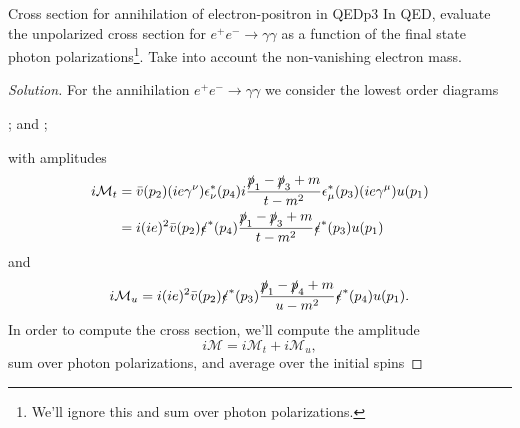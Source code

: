 \begin{problem}{Cross section for annihilation of electron-positron in QED}{p3}
    In QED, evaluate the unpolarized cross section for \(e^+ e^- \to \gamma \gamma\) as a function of the final state photon polarizations\footnote{We'll ignore this and sum over photon polarizations.}. Take into account the non-vanishing electron mass.
\end{problem}
\begin{proof}[Solution]
    For the annihilation \(e^+ e^- \to \gamma \gamma\) we consider the lowest order diagrams
    \begin{center}
        ;
        and
        ;
    \end{center}
    with amplitudes
    \begin{align*}
        i \mathcal{M}_t &= \bar{v}(p_2) (i e \gamma^\nu) \epsilon^*_{\nu}(p_4) i\frac{\slashed{p}_1 - \slashed{p}_3 + m}{t - m^2} \epsilon^*_{\mu}(p_3) (i e \gamma^\mu) u(p_1) \\
                        &= i(ie)^2 \bar{v}(p_2) \slashed{\epsilon}^*(p_4) \frac{\slashed{p}_1 - \slashed{p}_3 + m}{t - m^2} \slashed{\epsilon}^*(p_3) u(p_1)
    \end{align*}
    and
    \begin{equation*}
        i\mathcal{M}_u = i(ie)^2 \bar{v}(p_2) \slashed{\epsilon}^*(p_3) \frac{\slashed{p}_1 - \slashed{p}_4 + m}{u - m^2} \slashed{\epsilon}^*(p_4) u(p_1).
    \end{equation*}
    In order to compute the cross section, we'll compute the amplitude
    \begin{equation*}
        i \mathcal{M} = i\mathcal{M}_t +  i\mathcal{M}_u,
    \end{equation*}
    sum over photon polarizations, and average over the initial spins

\end{proof}
